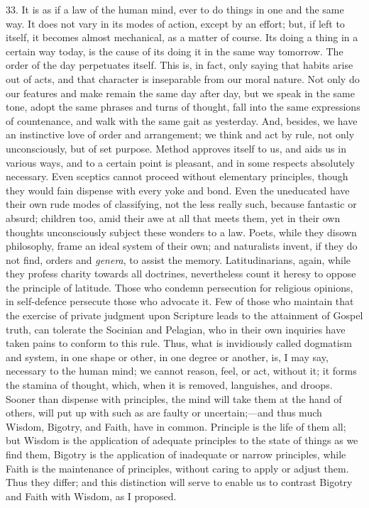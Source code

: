 33. It is as if a law of the human mind, ever to
do things in one and the same way. It does not vary in its modes of
action, except by an effort; but, if left to itself, it becomes almost
mechanical, as a matter of course. Its doing a thing in a certain way
today, is the cause of its doing it in the same way tomorrow. The
order of the day perpetuates itself. This is, in fact, only saying
that habits arise out of acts, and that character is inseparable from
our moral nature. Not only do our features and make remain the same
day after day, but we speak in the same tone, adopt the same phrases
and turns of thought, fall into the same expressions of countenance,
and walk with the same gait as yesterday. And, besides, we have an
instinctive love of order and arrangement; we think and act by rule,
not only unconsciously, but of set purpose. Method approves itself to
us, and aids us in various ways, and to a certain point is pleasant,
and in some respects absolutely necessary. Even sceptics cannot
proceed without elementary principles, though they would fain dispense
with every yoke and bond. Even the uneducated have their own rude
modes of classifying, not the less really such, because fantastic or
absurd; children too, amid their awe at all that meets them, yet in
their own thoughts unconsciously subject these wonders to a law.
Poets, while they disown philosophy, frame an ideal system of their
own; and naturalists invent, if they do not find, orders and \emph{genera},
to assist the memory. Latitudinarians, again, while they profess
charity towards all doctrines, nevertheless count it heresy to oppose
the principle of latitude. Those who condemn persecution for religious
opinions, in self-defence persecute those who advocate it. Few of
those who maintain that the exercise of private judgment upon
Scripture leads to the attainment of Gospel truth, can tolerate the
Socinian and Pelagian, who in their own inquiries have taken pains to
conform to this rule. Thus, what is invidiously called dogmatism and
system, in one shape or other, in one degree or another, is, I may
say, necessary to the human mind; we cannot reason, feel, or act,
without it; it forms the stamina of thought, which, when it is
removed, languishes, and droops. Sooner than dispense with principles,
the mind will take them at the hand of others, will put up with such
as are faulty or uncertain;—and thus much Wisdom, Bigotry, and
Faith, have in common. Principle is the life of them all; but Wisdom
is the application of adequate principles to the state of things as we
find them, Bigotry is the application of inadequate or narrow
principles, while Faith is the maintenance of principles, without
caring to apply or adjust them. Thus they differ; and this distinction
will serve to enable us to contrast Bigotry and Faith with Wisdom, as
I proposed.

